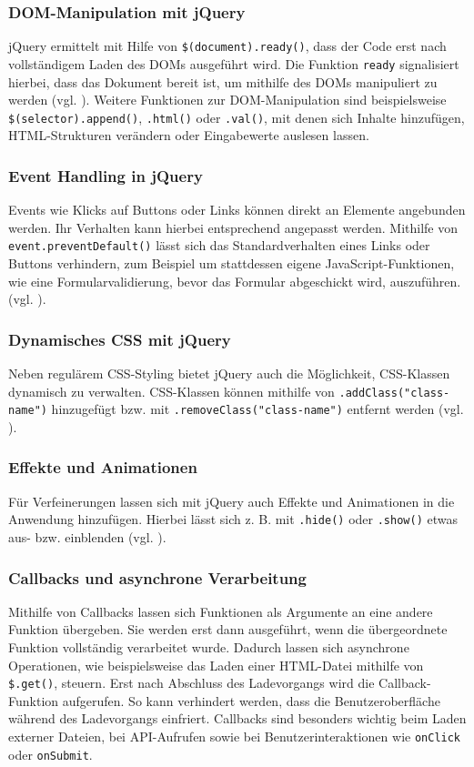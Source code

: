 \documentclass[oneside]{ausarbeitung}
\begin{document}
\subsubsection{DOM-Manipulation mit jQuery}
jQuery ermittelt mit Hilfe von \texttt{\$(document).ready()}, dass der Code erst nach vollständigem Laden des DOMs ausgeführt wird. Die Funktion \texttt{ready} signalisiert hierbei, dass das Dokument bereit ist, um mithilfe des DOMs manipuliert zu werden (vgl. \parencite{jquery_api}).  
Weitere Funktionen zur DOM-Manipulation sind beispielsweise \texttt{\$(selector).append()}, \texttt{.html()} oder \texttt{.val()}, mit denen sich Inhalte hinzufügen, HTML-Strukturen verändern oder Eingabewerte auslesen lassen.

\subsubsection{Event Handling in jQuery}
Events wie Klicks auf Buttons oder Links können direkt an Elemente angebunden werden. Ihr Verhalten kann hierbei entsprechend angepasst werden. Mithilfe von \texttt{event.preventDefault()} lässt sich das Standardverhalten eines Links oder Buttons verhindern, zum Beispiel um stattdessen eigene JavaScript-Funktionen, wie eine Formularvalidierung, bevor das Formular abgeschickt wird, auszuführen. (vgl. \parencite{jquery_api}).

\subsubsection{Dynamisches CSS mit jQuery}

Neben regulärem CSS-Styling bietet jQuery auch die Möglichkeit, CSS-Klassen dynamisch zu verwalten.  
CSS-Klassen können mithilfe von \texttt{.addClass("class-name")} hinzugefügt bzw. mit \texttt{.removeClass("class-name")} entfernt werden (vgl. \parencite{jquery_api}).


\subsubsection{Effekte und Animationen}
Für Verfeinerungen lassen sich mit jQuery auch Effekte und Animationen in die Anwendung hinzufügen. Hierbei lässt sich z. B. mit \texttt{.hide()} oder \texttt{.show()} etwas aus- bzw. einblenden (vgl. \parencite{jquery_api}).  

\subsubsection{Callbacks und asynchrone Verarbeitung}
Mithilfe von Callbacks lassen sich Funktionen als Argumente an eine andere Funktion übergeben. Sie werden erst dann ausgeführt, wenn die übergeordnete Funktion vollständig verarbeitet wurde. Dadurch lassen sich asynchrone Operationen, wie beispielsweise das Laden einer HTML-Datei mithilfe von \texttt{\$.get()}, steuern. Erst nach Abschluss des Ladevorgangs wird die Callback-Funktion aufgerufen. So kann verhindert werden, dass die Benutzeroberfläche während des Ladevorgangs einfriert. Callbacks sind besonders wichtig beim Laden externer Dateien, bei API-Aufrufen sowie bei Benutzerinteraktionen wie \texttt{onClick} oder \texttt{onSubmit}.
\end{document}
